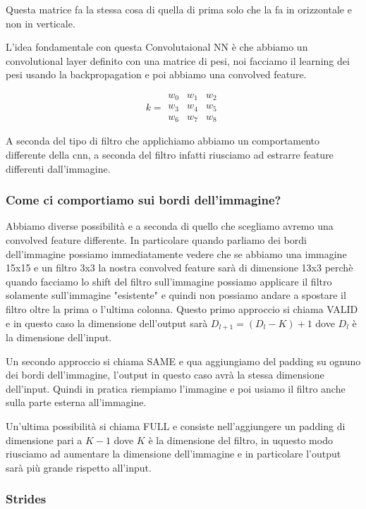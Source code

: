 \documentclass[14pt]{extreport}
\begin{document}
Questa matrice fa la stessa cosa di quella di prima solo che la fa in orizzontale e non in verticale.

L'idea fondamentale con questa Convolutaional NN è che abbiamo un convolutional layer definito con una matrice di pesi, noi facciamo il learning dei
pesi usando la backpropagation e poi abbiamo una convolved feature.

\begin{equation}
	k = \begin{matrix}
w_0 & w_1 & w_2\\
w_3 & w_4 & w_5\\
w_6 & w_7 & w_8
\end{matrix}
\end{equation}


A seconda del tipo di filtro che applichiamo abbiamo un comportamento differente della cnn, a seconda del filtro infatti riusciamo ad estrarre feature
differenti dall'immagine.

\subsubsection{Come ci comportiamo sui bordi dell'immagine?}

Abbiamo diverse possibilità e a seconda di quello che scegliamo avremo una convolved feature differente. In particolare quando parliamo dei bordi
dell'immagine possiamo immediatamente vedere che se abbiamo una immagine 15x15 e un filtro 3x3 la nostra convolved feature sarà di dimensione 13x3
perchè quando facciamo lo shift del filtro sull'immagine possiamo applicare il filtro solamente sull'immagine "esistente" e quindi non possiamo andare
a spostare il filtro oltre la prima o l'ultima colonna. Questo primo approccio si chiama VALID e in questo caso la dimensione dell'output sarà
$D_{l+1} = (D_l - K) + 1$ dove $D_l$ è la dimensione dell'input.

Un secondo approccio si chiama SAME e qua aggiungiamo del padding su ognuno dei bordi dell'immagine, l'output in questo caso avrà la stessa dimensione
dell'input. Quindi in pratica riempiamo l'immagine e poi usiamo il filtro anche sulla parte esterna all'immagine.

Un'ultima possibilità si chiama FULL e consiste nell'aggiungere un padding di dimensione pari a $K-1$ dove $K$ è la dimensione del filtro, in uquesto
modo riusciamo ad aumentare la dimensione dell'immagine e in particolare l'output sarà più grande rispetto all'input.


\subsubsection{Strides}
\end{document}
